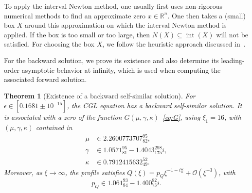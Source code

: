 \documentclass[11pt]{article}
\newtheorem{theorem}[definition]{Theorem}
\newcommand{\codenumber}[1]{#1}
\newcommand{\resultnumber}[1]{#1}
\begin{document}
To apply the interval Newton method, one usually first uses
non-rigorous numerical methods to find an approximate zero
\(x \in \mathbb{R}^{n}\). One then takes a (small) box \(X\) around
this approximation on which the interval Newton method is applied. If
the box is too small or too large, then
\(N(X) \subseteq \operatorname{int}(X)\) will not be satisfied. For
choosing the box \(X\), we follow the heuristic approach discussed
in~\cite[Section~10]{Dahne2024}.

For the backward solution, we prove its existence and also determine
its leading-order asymptotic behavior at infinity, which is used when
computing the associated forward solution.

\begin{theorem}[Existence of a backward self-similar solution]\label{thm:backward-existence}
  For \(\epsilon \in \codenumber{[0.1681 \pm 10^{-15}]}\), the CGL
  equation has a backward self-similar solution. It is associated with
  a zero of the function \(G(\mu, \gamma, \kappa)\)~\eqref{eq:G},
  using \(\xi_{1} = \codenumber{16}\), with \((\mu, \gamma, \kappa)\)
  contained in
  \begin{align*}
    \mu &\in \resultnumber{2.2600773707_{82}^{95}},\\
    \gamma &\in \resultnumber{1.0571_{81}^{95} - 1.4043_{175}^{298} i},\\
    \kappa &\in \resultnumber{0.7912415632_{49}^{52}}.
  \end{align*}
  Moreover, as \(\xi \to \infty\), the profile satisfies
  \(Q(\xi) = p_{Q}\xi^{-1 - i\frac{\omega}{\kappa}} +
  \mathcal{O}(\xi^{-3})\), with
  \begin{equation*}
    p_{Q} \in \resultnumber{1.061_{84}^{93} - 1.400_{73}^{82} i}.
  \end{equation*}
\end{theorem}
\end{document}
